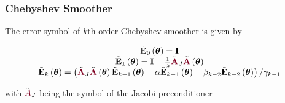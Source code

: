 \documentclass{beamer}
\begin{document}
\begin{frame}
\begin{center}
\frametitle{Chebyshev Smoother}

The error symbol of $k$th order Chebyshev smoother is given by

\begin{equation}
\begin{tabular}{c}
$\tilde{\mathbf{E}}_0 \left( \boldsymbol{\theta} \right) = \mathbf{I}$\\
$\tilde{\mathbf{E}}_1 \left( \boldsymbol{\theta} \right) = \mathbf{I} - \frac{1}{\alpha} \tilde{\color{burgundy}\mathbf{A}}_J \tilde{\color{burgundy}\mathbf{A}} \left( \boldsymbol{\theta} \right)$\\
$\tilde{\mathbf{E}}_k \left( \boldsymbol{\theta} \right) = \left( \tilde{\color{burgundy}\mathbf{A}}_J \tilde{\color{burgundy}\mathbf{A}} \left( \boldsymbol{\theta} \right) \tilde{\mathbf{E}}_{k - 1} \left( \boldsymbol{\theta} \right) - \alpha \tilde{\mathbf{E}}_{k - 1} \left( \boldsymbol{\theta} \right) - \beta_{k - 2} \tilde{\mathbf{E}}_{k - 2} \left( \boldsymbol{\theta} \right) \right) / \gamma_{k - 1}$
\end{tabular}
\end{equation}

with $\tilde{\color{burgundy}A}_J$ being the symbol of the Jacobi preconditioner

\end{center}
\end{frame}

\end{document}
